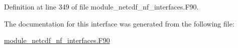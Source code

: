 Definition at line 349 of file module\+\_\+netcdf\+\_\+nf\+\_\+interfaces.\+F90.



The documentation for this interface was generated from the following file\+:\begin{DoxyCompactItemize}
\item 
\hyperlink{module__netcdf__nf__interfaces_8F90}{module\+\_\+netcdf\+\_\+nf\+\_\+interfaces.\+F90}\end{DoxyCompactItemize}
